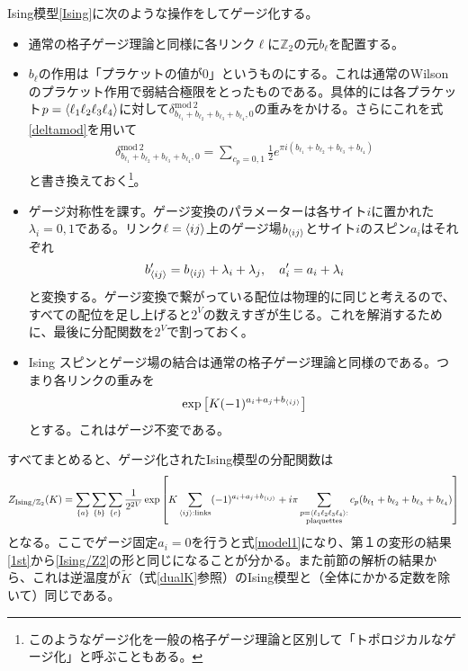 \documentclass[a4paper,12pt,dvipdfmx]{jlreq}
\newcommand{\Zb}{\mathbb{Z}}
\newcommand{\Kt}{\widetilde{K}}
\newcommand{\ZGIs}{Z_{\mathrm{Ising}/\mathbb{Z}_2}}
\newcommand{\deltamod}{\delta^{\mathrm{mod}\ 2}}
\begin{document}
Ising模型\eqref{Ising}に次のような操作をしてゲージ化する。
\begin{itemize}
  \item 通常の格子ゲージ理論と同様に各リンク$\ell$に$\Zb_2$の元$b_{\ell}$を配置する。
  \item $b_{\ell}$の作用は「プラケットの値が$0$」というものにする。これは通常のWilsonのプラケット作用で弱結合極限をとったものである。具体的には各プラケット$p=\expval{\ell_1 \ell_2 \ell_3 \ell_4}$に対して$\deltamod_{b_{\ell_1}+b_{\ell_2}+b_{\ell_3}+b_{\ell_4},0}$の重みをかける。さらにこれを式\eqref{deltamod}を用いて
  \begin{align}
    \deltamod_{b_{\ell_1}+b_{\ell_2}+b_{\ell_3}+b_{\ell_4},0}=\sum_{c_p=0,1}\frac{1}{2}e^{\pi i (b_{\ell_1}+b_{\ell_2}+b_{\ell_3}+b_{\ell_4})}
  \end{align}
  と書き換えておく\footnote{このようなゲージ化を一般の格子ゲージ理論と区別して「トポロジカルなゲージ化」と呼ぶこともある。}。
  \item ゲージ対称性を課す。ゲージ変換のパラメーターは各サイト$i$に置かれた$\lambda_i=0,1$である。リンク$\ell=\expval{ij}$上のゲージ場$b_{\expval{ij}}$とサイト$i$のスピン$a_{i}$はそれぞれ
  \begin{align}
    b_{\expval{ij}}'=b_{\expval{ij}}+\lambda_{i}+\lambda_{j},\quad
    a_{i}'=a_{i}+\lambda_{i}
    \label{gaugetransf}
  \end{align}
  と変換する。ゲージ変換で繋がっている配位は物理的に同じと考えるので、すべての配位を足し上げると$2^V$の数えすぎが生じる。これを解消するために、最後に分配関数を$2^{V}$で割っておく。
  \item Ising スピンとゲージ場の結合は通常の格子ゲージ理論と同様のである。つまり各リンクの重みを
  \begin{align}
    \exp\qty[K (-1)^{a_i+a_j+b_{\expval{ij}}}]
  \end{align}
  とする。これはゲージ不変である。
\end{itemize}

すべてまとめると、ゲージ化されたIsing模型の分配関数は
\begin{align}
  \ZGIs(K)=\sum_{\{a\}}\sum_{\{b\}}\sum_{\{c\}}\frac{1}{2^{2V}} \exp\left[
    K\sum_{\expval{ij}:\text{links}}(-1)^{a_i+a_j+b_{\expval{ij}}}+i\pi\sum_{\substack{p=\expval{\ell_1 \ell_2 \ell_3 \ell_4}:\\ \text{plaquettes}}} c_{p}(b_{\ell_1}+b_{\ell_2}+b_{\ell_3}+b_{\ell_4})
  \right]
  \label{model2}
\end{align}
となる。ここでゲージ固定$a_{i}=0$を行うと式\eqref{model1}になり、第１の変形の結果\eqref{1st}から\eqref{Ising/Z2}の形と同じになることが分かる。また前節の解析の結果から、これは逆温度が$\Kt$（式\eqref{dualK}参照）のIsing模型と（全体にかかる定数を除いて）同じである。
\end{document}
